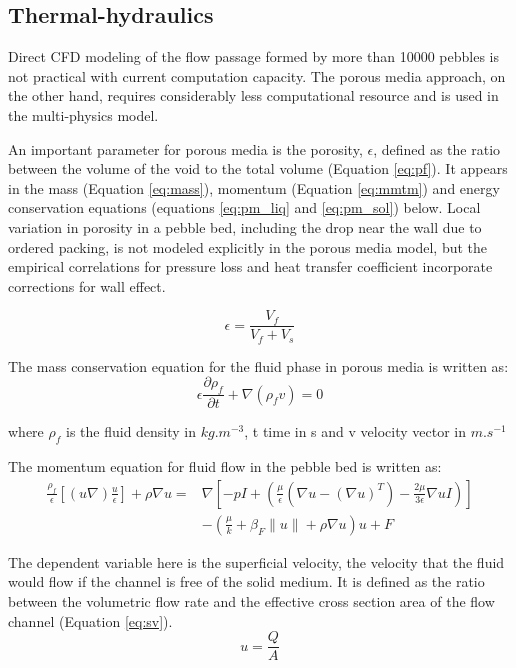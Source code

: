 \documentclass{elsarticle}
\begin{document}
\subsection{Thermal-hydraulics}
Direct CFD modeling of the flow passage formed by more than 10000 pebbles is not practical with current computation capacity. The porous media approach, on the other hand, requires considerably less computational resource and is used in the multi-physics model.

An important parameter for porous media is the porosity, $\epsilon$, defined as the ratio between the volume of the void to the total volume (Equation \ref{eq:pf}). It appears in the mass (Equation \ref{eq:mass}), momentum (Equation \ref{eq:mmtm}) and energy conservation equations (equations \ref{eq:pm_liq} and \ref{eq:pm_sol}) below. Local variation in porosity in a pebble bed, including the drop near the wall due to ordered packing, is not modeled explicitly in the porous media model, but the empirical correlations for pressure loss and heat transfer coefficient incorporate corrections for wall effect.


\begin{equation}
  \epsilon = \frac{V_f}{V_f+V_s}
  \label{eq:pf}
\end{equation}

The mass conservation equation for the fluid phase in porous media is written as:
\begin{equation}
  \epsilon\frac{\partial \rho_f}{\partial t} + \nabla(\rho_fv) = 0
  \label{eq:mass}
\end{equation}

where $\rho_f$ is the fluid density in $kg.m^{-3}$, t time in s and v velocity vector in $m.s^{-1}$

The momentum equation for fluid flow in the pebble bed is written as:
\begin{align}
  \frac{\rho_f}{\epsilon} \left[(u\nabla)\frac{u}{\epsilon} \right] + \rho\nabla u = &\nabla \left[ -pI + (\frac{\mu}{\epsilon}(\nabla u - (\nabla u)^T) - \frac{2\mu}{3\epsilon} \nabla u I)\right]  \nonumber\\
  &- (\frac{\mu}{k} + \beta_F \|u\| + \rho\nabla u) u + F
  \label{eq:mmtm}
\end{align}

The dependent variable here is the superficial velocity, the velocity that the fluid would flow if the channel is free of the solid medium. It is defined as the ratio between the volumetric flow rate and the effective cross section area of the flow channel (Equation \ref{eq:sv}).
\begin{equation}
  u=\frac{Q}{A}
  \label{eq:sv}
\end{equation}
\end{document}
